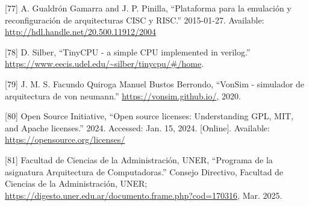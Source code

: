 \documentclass[12pt,oneside]{templates/unerthesis}
\newcommand{\CSLLeftMargin}[1]{#1} %
\newcommand{\CSLRightInline}[1]{#1} %
\newlength{\cslhangindent}
\newenvironment{CSLReferences}[2] %
 {\setlength{\parindent}{0pt}%
  \setlength{\leftskip}{#1 pt\relax}%
  \setlength{\parskip}{#2 pt\relax}%
  \everypar{\setlength{\hangindent}{\cslhangindent}}}
 {\par}
\begin{document}
\begin{CSLReferences}{0}{0}
\leavevmode{}%
\CSLLeftMargin{{[}77{]} }%
\CSLRightInline{A. Gualdrón Gamarra and J. P. Pinilla, {``Plataforma para la emulación y reconfiguración de arquitecturas CISC y RISC.''} 2015-01-27. Available: \url{http://hdl.handle.net/20.500.11912/2004}}

\leavevmode{}%
\CSLLeftMargin{{[}78{]} }%
\CSLRightInline{D. Silber, {``TinyCPU - a simple CPU implemented in verilog.''} \url{https://www.eecis.udel.edu/~silber/tinycpu/\#/home}.}

\leavevmode{}%
\CSLLeftMargin{{[}79{]} }%
\CSLRightInline{J. M. S. Facundo Quiroga Manuel Bustos Berrondo, {``VonSim - simulador de arquitectura de von neumann.''} \url{https://vonsim.github.io/}, 2020.}

\leavevmode{}%
\CSLLeftMargin{{[}80{]} }%
\CSLRightInline{Open Source Initiative, {``Open source licenses: Understanding {GPL}, {MIT}, and {Apache} licenses.''} 2024. Accessed: Jan. 15, 2024. {[}Online{]}. Available: \url{https://opensource.org/licenses/}}

\leavevmode{}%
\CSLLeftMargin{{[}81{]} }%
\CSLRightInline{Facultad de Ciencias de la Administración, UNER, {``{Programa de la asignatura Arquitectura de Computadoras}.''} Consejo Directivo, Facultad de Ciencias de la Administración, UNER; \url{https://digesto.uner.edu.ar/documento.frame.php?cod=170316}, Mar. 2025.}

\end{CSLReferences}

%


\end{document}
